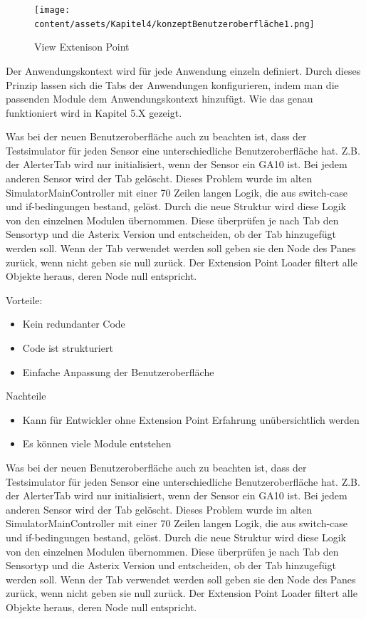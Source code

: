 \begin{figure}[h]
    \centering
    \texttt{[image: content/assets/Kapitel4/konzeptBenutzeroberfläche1.png]}
    \caption{View Extenison Point}
\end{figure}

Der Anwendungskontext wird für jede Anwendung einzeln definiert. Durch dieses Prinzip lassen sich die Tabs der Anwendungen konfigurieren, indem man die passenden Module dem Anwendungskontext hinzufügt. Wie das genau funktioniert wird in Kapitel 5.X gezeigt.

Was bei der neuen Benutzeroberfläche auch zu beachten ist, dass der Testsimulator für jeden Sensor eine unterschiedliche Benutzeroberfläche hat. Z.B. der AlerterTab wird nur initialisiert, wenn der Sensor ein GA10 ist. Bei jedem anderen Sensor wird der Tab gelöscht. Dieses Problem wurde im alten SimulatorMainController mit einer 70 Zeilen langen Logik, die aus switch-case und if-bedingungen bestand, gelöst. Durch die neue Struktur wird diese Logik von den einzelnen Modulen übernommen. Diese überprüfen je nach Tab den Sensortyp und die Asterix Version und entscheiden, ob der Tab hinzugefügt werden soll. Wenn der Tab verwendet werden soll geben sie den Node des Panes zurück, wenn nicht geben sie null zurück. Der Extension Point Loader filtert alle Objekte heraus, deren Node null entspricht.

Vorteile:
\begin{itemize}
    \item Kein redundanter Code
    \item Code ist strukturiert
    \item Einfache Anpassung der Benutzeroberfläche
\end{itemize}

Nachteile
\begin{itemize}
    \item Kann für Entwickler ohne Extension Point Erfahrung unübersichtlich werden
    \item Es können viele Module entstehen    
\end{itemize}

Was bei der neuen Benutzeroberfläche auch zu beachten ist, dass der Testsimulator für jeden Sensor eine unterschiedliche Benutzeroberfläche hat. Z.B. der AlerterTab wird nur initialisiert, wenn der Sensor ein GA10 ist. Bei jedem anderen Sensor wird der Tab gelöscht. Dieses Problem wurde im alten SimulatorMainController mit einer 70 Zeilen langen Logik, die aus switch-case und if-bedingungen bestand, gelöst. Durch die neue Struktur wird diese Logik von den einzelnen Modulen übernommen. Diese überprüfen je nach Tab den Sensortyp und die Asterix Version und entscheiden, ob der Tab hinzugefügt werden soll. Wenn der Tab verwendet werden soll geben sie den Node des Panes zurück, wenn nicht geben sie null zurück. Der Extension Point Loader filtert alle Objekte heraus, deren Node null entspricht.

